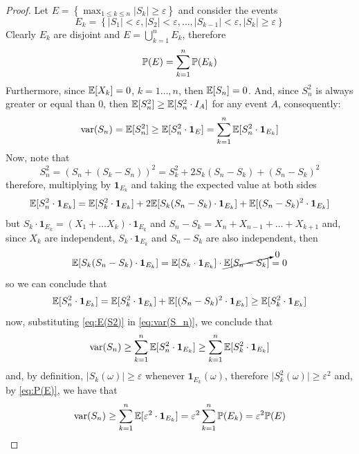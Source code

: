 \begin{proof}
    Let $E=\left\{\max_{1\leq k\leq n}\lvert S_k\rvert\geq\varepsilon\right\}$ and consider the events
    $$E_k=\left\{\lvert S_1\rvert<\varepsilon,\lvert S_2\rvert<\varepsilon,\dots,\lvert S_{k-1}\rvert<\varepsilon,\lvert S_k\rvert\geq\varepsilon\right\}$$
    Clearly $E_k$ are disjoint and $E=\bigcup_{k=1}^nE_k$, therefore
    \begin{equation}\label{eq:P(E)}
        \mathbb{P}(E)=\sum_{k=1}^n\mathbb{P}(E_k)
    \end{equation}
    Furthermore, since $\mathbb{E}[X_k]=0$, $k=1\dots,n$, then $\mathbb{E}[S_n]=0$. And, since $S_n^2$ is always greater or equal than $0$, then $\mathbb{E}[S_n^2]\geq\mathbb{E}[S_n^2\cdot I_A]$ for any event $A$, consequently:
    \begin{equation}\label{eq:var(S_n)}
        \text{var}(S_n)=\mathbb{E}[S_n^2]\geq\mathbb{E}[S_n^2\cdot\boldsymbol{1}_E]=\sum_{k=1}^n\mathbb{E}[S_n^2\cdot\boldsymbol{1}_{E_k}]
    \end{equation}
    Now, note that
    $$S_n^2=(S_n+(S_k-S_n))^2=S_k^2+2S_k(S_n-S_k)+(S_n-S_k)^2$$
    therefore, multiplying by $\boldsymbol{1}_{E_k}$ and taking the expected value at both sides
    $$\mathbb{E}[S_n^2\cdot\boldsymbol{1}_{E_k}]=\mathbb{E}[S_k^2\cdot\boldsymbol{1}_{E_k}]+2\mathbb{E}[S_k(S_n-S_k)\cdot\boldsymbol{1}_{E_k}]+\mathbb{E}[(S_n-S_k)^2\cdot\boldsymbol{1}_{E_k}]$$
    but $S_k\cdot\boldsymbol{1}_{E_k}=(X_1+\dots X_k)\cdot\boldsymbol{1}_{E_k}$ and $S_n-S_k=X_n+X_{n-1}+\dots+X_{k+1}$ and, since $X_k$ are independent, $S_k\cdot\boldsymbol{1}_{E_k}$ and $S_n-S_k$ are also independent, then
    $$\mathbb{E}[S_k(S_n-S_k)\cdot\boldsymbol{1}_{E_k}]=\mathbb{E}[S_k\cdot\boldsymbol{1}_{E_k}]\cdot\cancelto0{\mathbb{E}[S_n-S_k]}=0$$
    so we can conclude that
    \begin{equation}\label{eq:E(S2)}
        \mathbb{E}[S_n^2\cdot\boldsymbol{1}_{E_k}]=\mathbb{E}[S_k^2\cdot\boldsymbol{1}_{E_k}]+\mathbb{E}[(S_n-S_k)^2\cdot\boldsymbol{1}_{E_k}]\geq\mathbb{E}[S_k^2\cdot\boldsymbol{1}_{E_k}]
    \end{equation}
    now, substituting \cref{eq:E(S2)} in \cref{eq:var(S_n)}, we conclude that
    $$\text{var}(S_n)\geq\sum_{k=1}^n\mathbb{E}[S_n^2\cdot\boldsymbol{1}_{E_k}]\geq\sum_{k=1}^n\mathbb{E}[S_k^2\cdot\boldsymbol{1}_{E_k}]$$
    and, by definition, $\lvert S_k(\omega)\rvert\geq\varepsilon$ whenever $\boldsymbol{1}_{E_k}(\omega)$, therefore $\lvert S_k^2(\omega)\rvert\geq\varepsilon^2$ and, by \cref{eq:P(E)}, we have that
    $$\text{var}(S_n)\geq\sum_{k=1}^n\mathbb{E}[\varepsilon^2\cdot\boldsymbol{1}_{E_k}]=\varepsilon^2\sum_{k=1}^n\mathbb{P}(E_k)=\varepsilon^2\mathbb{P}(E)$$
\end{proof}

